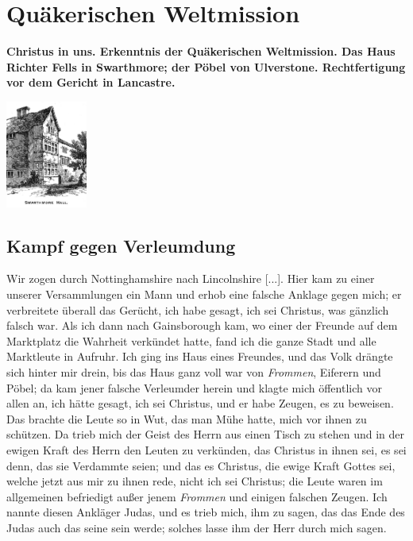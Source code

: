
\chapter[Quäkerischen Weltmission]{Quäkerischen Weltmission}

\begin{center}
\textbf{Christus in uns. Erkenntnis der Quäkerischen Weltmission. Das
Haus Richter Fells in Swarthmore; der Pöbel 
von Ulverstone.
Rechtfertigung vor dem Gericht in Lancastre.}
\end{center}



\begin{floatingfigure}[3]{4cm}
\includegraphics[width=0.20\textwidth]{./pics/swarthmore_hall.png}
\label{bild:swarthmoor} 
\end{floatingfigure}

\section{Kampf gegen Verleumdung}

Wir zogen durch Nottinghamshire 
nach Lincolnshire [...].
Hier kam zu einer unserer Versammlungen ein Mann und erhob eine
falsche Anklage gegen mich; er verbreitete 
überall das Gerücht, ich
habe gesagt, ich sei Christus, was gänzlich falsch war. Als ich dann
nach Gainsborough kam, wo einer 
der Freunde auf dem Marktplatz die Wahrheit 
verkündet hatte, fand ich die ganze Stadt und
alle Marktleute in Aufruhr. Ich ging ins Haus eines Freundes,
und das Volk drängte sich hinter mir drein, bis das Haus ganz
voll war von \textit{Frommen}, Eiferern und Pöbel; da kam jener
falsche Verleumder herein und klagte mich öffentlich vor allen an,
ich hätte gesagt, ich sei Christus, und er habe Zeugen, es zu 
beweisen. Das brachte die Leute so in Wut, das man Mühe hatte,
mich vor ihnen zu schützen. Da trieb mich der Geist des Herrn
aus einen Tisch zu stehen und in der ewigen Kraft des Herrn
den Leuten zu verkünden, das Christus in ihnen sei, es sei denn,
das sie Verdammte seien; und das es Christus, die ewige Kraft
Gottes sei, welche jetzt aus mir zu ihnen rede, nicht ich sei Christus;
die Leute waren im allgemeinen befriedigt außer jenem \textit{Frommen}
und einigen falschen Zeugen. Ich nannte diesen Ankläger
Judas,
und es trieb mich, ihm zu sagen, das das Ende des Judas auch
das seine sein werde; solches lasse ihm der Herr durch mich sagen.


